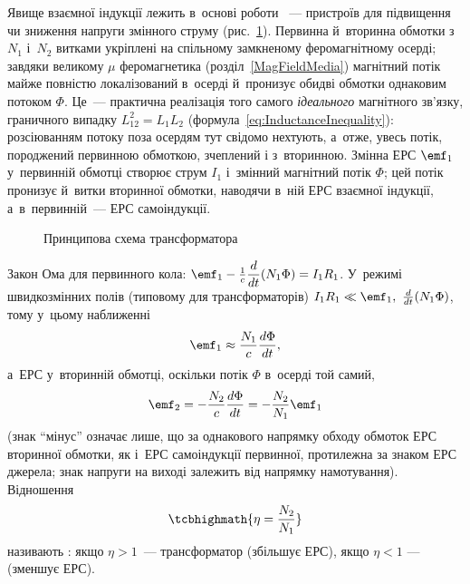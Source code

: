 Явище взаємної індукції лежить в~основі роботи ~--- пристроїв для
підвищення чи зниження напруги змінного струму (рис.~\ref{pic:Transformer}). Первинна
й~вторинна обмотки з~$N_1$ і~$N_2$ витками укріплені на спільному замкненому
феромагнітному осерді; завдяки великому $\mu$ феромагнетика (розділ~\ref{MagFieldMedia})
магнітний потік майже повністю локалізований в~осерді й~пронизує обидві обмотки однаковим
потоком $\Phi$. Це~--- практична реалізація того самого \emph{ідеального} магнітного
зв'язку, граничного випадку $L_{12}^2=L_1L_2$ (формула~\eqref{eq:InductanceInequality}): розсіюванням
потоку поза осердям тут свідомо нехтують, а~отже, увесь потік, породжений первинною
обмоткою, зчеплений і з~вторинною. Змінна ЕРС $\emf_1$ у~первинній обмотці створює струм
$I_1$ і~змінний магнітний потік $\Phi$; цей потік пронизує й~витки вторинної обмотки,
наводячи в~ній ЕРС взаємної індукції, а~в~первинній~--- ЕРС самоіндукції.

\begin{figure}[h!]\centering
	\caption{Принципова схема трансформатора\label{pic:Transformer}}
\end{figure}

Закон Ома для первинного кола: $\emf_1 - \frac1c\dfrac{d}{dt}(N_1\Phi) = I_1R_1$. У~режимі
швидкозмінних полів (типовому для трансформаторів) $I_1R_1 \ll \emf_1,\
\tfrac{d}{dt}(N_1\Phi)$, тому у~цьому наближенні
\begin{equation}\label{eq:TransformerEMF1}
	\emf_1 \approx \frac{N_1}c\frac{d\Phi}{dt},
\end{equation}
а~ЕРС у~вторинній обмотці, оскільки потік $\Phi$ в~осерді той самий,
\begin{equation}\label{eq:TransformerEMF2}
	\emf_2 = -\frac{N_2}c\frac{d\Phi}{dt} = -\frac{N_2}{N_1}\emf_1
\end{equation}
(знак \enquote{мінус} означає лише, що за однакового напрямку обходу обмоток ЕРС вторинної обмотки, як і~ЕРС самоіндукції первинної, протилежна за знаком ЕРС джерела; знак напруги на виході залежить від напрямку намотування). Відношення
\begin{equation}\label{eq:TransformationRatio}
	\tcbhighmath{
		\eta = \frac{N_2}{N_1}
	}
\end{equation}
називають : якщо $\eta>1$~--- трансформатор
\emphx{підвищувальний} (збільшує ЕРС), якщо $\eta<1$ --- \emphx{знижувальний} (зменшує
ЕРС).

